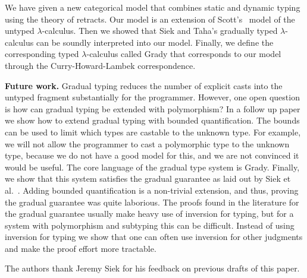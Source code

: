 We have given a new categorical model that combines static and dynamic
typing using the theory of retracts.  Our model is an extension of
Scott's~\cite{Scott:1980} model of the untyped $\lambda$-calculus.
Then we showed that Siek and Taha's gradually typed $\lambda$-calculus
\cite{Siek:2015} can be soundly interpreted into our model.  Finally,
we define the corresponding typed $\lambda$-calculus called Grady that
corresponds to our model through the Curry-Howard-Lambek
correspondence.

\textbf{Future work.}  Gradual typing reduces the number of explicit
casts into the untyped fragment substantially for the programmer.
However, one open question is how can gradual typing be extended with
polymorphism?  In a follow up paper we show how to extend gradual
typing with bounded quantification.  The bounds can be used to limit
which types are castable to the unknown type.  For example, we will
not allow the programmer to cast a polymorphic type to the unknown
type, because we do not have a good model for this, and we are not
convinced it would be useful.  The core language of the gradual type
system is Grady.  Finally, we show that this system satisfies the
gradual guarantee as laid out by Siek et al.~\cite{Siek:2015}.  Adding
bounded quantification is a non-trivial extension, and thus, proving
the gradual guarantee was quite laborious. The proofs found in the
literature for the gradual guarantee usually make heavy use of
inversion for typing, but for a system with polymorphism and subtyping
this can be difficult.  Instead of using inversion for typing we show
that one can often use inversion for other judgments and make the
proof effort more tractable.

\begin{ack}
  The authors thank Jeremy Siek for his feedback on previous drafts of
  this paper.
\end{ack}
